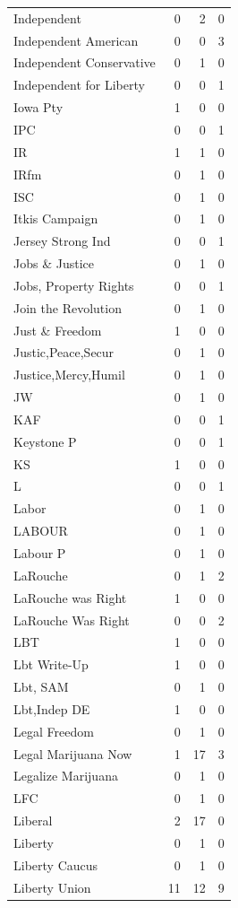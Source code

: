 \begin{supertabular}{lrrr}
Independent & 0 & 2 & 0\\
Independent American & 0 & 0 & 3\\
Independent Conservative & 0 & 1 & 0\\
Independent for Liberty & 0 & 0 & 1\\
Iowa Pty & 1 & 0 & 0\\
IPC & 0 & 0 & 1\\
IR & 1 & 1 & 0\\
IRfm & 0 & 1 & 0\\
ISC & 0 & 1 & 0\\
Itkis Campaign & 0 & 1 & 0\\
Jersey Strong Ind & 0 & 0 & 1\\
Jobs \& Justice & 0 & 1 & 0\\
Jobs, Property Rights & 0 & 0 & 1\\
Join the Revolution & 0 & 1 & 0\\
Just \& Freedom & 1 & 0 & 0\\
Justic,Peace,Secur & 0 & 1 & 0\\
Justice,Mercy,Humil & 0 & 1 & 0\\
JW & 0 & 1 & 0\\
KAF & 0 & 0 & 1\\
Keystone P & 0 & 0 & 1\\
KS & 1 & 0 & 0\\
L & 0 & 0 & 1\\
Labor & 0 & 1 & 0\\
LABOUR & 0 & 1 & 0\\
Labour P & 0 & 1 & 0\\
LaRouche & 0 & 1 & 2\\
LaRouche was Right & 1 & 0 & 0\\
LaRouche Was Right & 0 & 0 & 2\\
LBT & 1 & 0 & 0\\
Lbt Write-Up & 1 & 0 & 0\\
Lbt, SAM & 0 & 1 & 0\\
Lbt,Indep DE & 1 & 0 & 0\\
Legal Freedom & 0 & 1 & 0\\
Legal Marijuana Now & 1 & 17 & 3\\
Legalize Marijuana & 0 & 1 & 0\\
LFC & 0 & 1 & 0\\
Liberal & 2 & 17 & 0\\
Liberty & 0 & 1 & 0\\
Liberty Caucus & 0 & 1 & 0\\
Liberty Union & 11 & 12 & 9\\

\end{supertabular}
